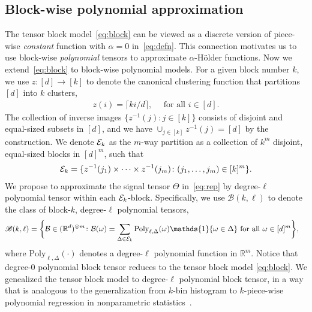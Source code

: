 \documentclass{article}
\theoremstyle{definition}
\def\caliB{\mathscr{B}}
\begin{document}
\subsection{Block-wise polynomial approximation}\label{sec:poly}
\vspace{-.2cm}
The tensor block model~\eqref{eq:block} can be viewed as a discrete version of piece-wise \emph{constant} function with $\alpha=0$ in~\eqref{eq:defn}. This connection motivates us to use block-wise \emph{polynomial} tensors to approximate $\alpha$-H\"older functions. Now we extend~\eqref{eq:block} to block-wise polynomial models. For a given block number $k$, we use $z\colon[d]\rightarrow [k]$ to denote the canonical clustering function that partitions $[d]$ into $k$ clusters,
\begin{align}
    z(i) = \lceil ki/d\rceil, \quad \text{ for all } i\in[d].
\end{align}
The collection of inverse images $\{z^{-1}(j)\colon j\in[k]\}$ consists of  disjoint and equal-sized subsets in $[d]$, and we have $\cup_{j\in[k]}z^{-1}(j) = [d]$ by the construction. We denote $\mathcal{E}_k$ as the $m$-way partition as a collection of $k^m$ disjoint, equal-sized blocks in $[d]^m$, such that 
\begin{align}\label{eq:blockind}
    \mathcal{E}_k = \{z^{-1}(j_1)\times\cdots\times z^{-1}(j_m)\colon (j_1,\ldots,j_m)\in [k]^m\}.
\end{align}
We propose to approximate the signal tensor $\Theta$ in~\eqref{eq:rep} by degree-$\ell$ polynomial tensor within each $\mathcal{E}_k$-block. Specifically, we use $\caliB(k,\ell)$ to denote the class of block-$k$, degree-$\ell$ polynomial tensors,
\begin{align}
    \caliB(k,\ell) = \bigg\{&\tB\in(\mathbb{R}^d)^{\otimes m}\colon \tB(\omega) = \sum_{\Delta\in\tE_k}\text{Poly}_{\ell,\Delta}(\omega)\mathds{1}\{\omega\in\Delta\}\text{ for all } \omega\in[d]^m\bigg\},
\end{align}
where $\text{Poly}_{\ell,\Delta}(\cdot)$ denotes a degree-$\ell$ polynomial function in $\mathbb{R}^m$. Notice that degree-0 polynomial block tensor reduces to the tensor block model \eqref{eq:block}. We genealized the tensor block model to degree-$\ell$ polynomial block tensor, in a way that is analogous to the generalization from $k$-bin histogram to $k$-piece-wise polynomial regression in nonparametric statistics~\cite{wasserman2006all}.
\end{document}
